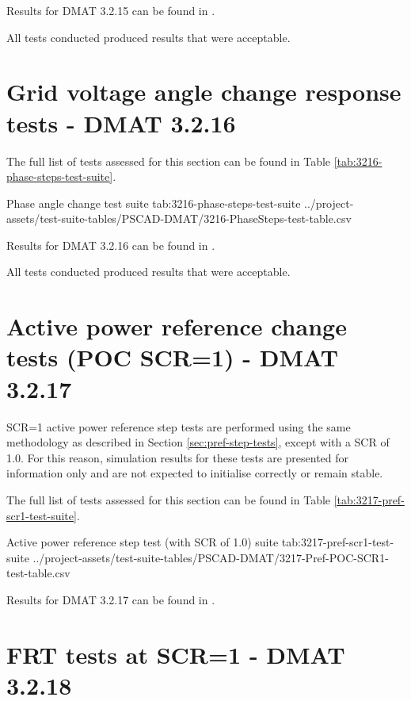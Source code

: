 \documentclass{../grid-link-report}
\newcommand{\projectassetsdir}{../project-assets}
\begin{document}
	Results for DMAT 3.2.15 can be found in .
	
	All tests conducted produced results that were acceptable.
	
	\section{Grid voltage angle change response tests - DMAT 3.2.16}		
	
	
	
	The full list of tests assessed for this section can be found in Table \ref{tab:3216-phase-steps-test-suite}.
	
	{
		\fontsize{7}{9}\selectfont
		\autoscaledlongtable
		{Phase angle change test suite}
		{tab:3216-phase-steps-test-suite}
		{\projectassetsdir/test-suite-tables/PSCAD-DMAT/3216-PhaseSteps-test-table.csv}
	}
	
	Results for DMAT 3.2.16 can be found in .
	
	All tests conducted produced results that were acceptable.
	
	
	\section{Active power reference change tests (POC SCR=1) - DMAT 3.2.17}		
	
	SCR=1 active power reference step tests are performed using the same methodology as described in Section \ref{sec:pref-step-tests}, except with a \ac{SCR} of 1.0. For this reason, simulation results for these tests are presented for information only and are not expected to initialise correctly or remain stable.
	
	The full list of tests assessed for this section can be found in Table \ref{tab:3217-pref-scr1-test-suite}.
	
	{
		\fontsize{7}{9}\selectfont
		\autoscaledlongtable
		{Active power reference step test (with SCR of 1.0) suite}
		{tab:3217-pref-scr1-test-suite}
		{\projectassetsdir/test-suite-tables/PSCAD-DMAT/3217-Pref-POC-SCR1-test-table.csv}
	}
	
	Results for DMAT 3.2.17 can be found in .
	
	
	\section{FRT tests at SCR=1 - DMAT 3.2.18}		
	
\end{document}
